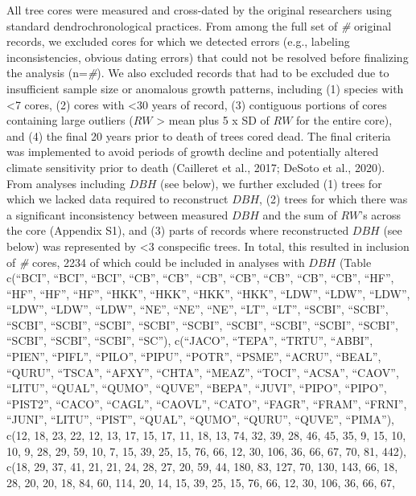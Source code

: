 \documentclass[
]{article}
\begin{document}
All tree cores were measured and cross-dated by the original researchers
using standard dendrochronological practices. From among the full set of
\emph{\#} original records, we excluded cores for which we detected
errors (e.g., labeling inconsistencies, obvious dating errors) that
could not be resolved before finalizing the analysis (n=\emph{\#}). We
also excluded records that had to be excluded due to insufficient sample
size or anomalous growth patterns, including (1) species with \textless7
cores, (2) cores with \textless30 years of record, (3) contiguous
portions of cores containing large outliers (\(RW\) \textgreater{} mean
plus 5 x SD of \(RW\) for the entire core), and (4) the final 20 years
prior to death of trees cored dead. The final criteria was implemented
to avoid periods of growth decline and potentially altered climate
sensitivity prior to death (Cailleret et al., 2017; DeSoto et al.,
2020). From analyses including \(DBH\) (see below), we further excluded
(1) trees for which we lacked data required to reconstruct \(DBH\), (2)
trees for which there was a significant inconsistency between measured
\(DBH\) and the sum of \(RW\)'s across the core (Appendix S1), and (3)
parts of records where reconstructed \(DBH\) (see below) was represented
by \textless3 conspecific trees. In total, this resulted in inclusion of
\emph{\#} cores, 2234 of which could be included in analyses with
\(DBH\) (Table c(``BCI'', ``BCI'', ``BCI'', ``CB'', ``CB'', ``CB'',
``CB'', ``CB'', ``CB'', ``CB'', ``HF'', ``HF'', ``HF'', ``HF'', ``HKK'',
``HKK'', ``HKK'', ``HKK'', ``LDW'', ``LDW'', ``LDW'', ``LDW'', ``LDW'',
``LDW'', ``NE'', ``NE'', ``NE'', ``LT'', ``LT'', ``SCBI'', ``SCBI'',
``SCBI'', ``SCBI'', ``SCBI'', ``SCBI'', ``SCBI'', ``SCBI'', ``SCBI'',
``SCBI'', ``SCBI'', ``SCBI'', ``SCBI'', ``SCBI'', ``SC''), c(``JACO'',
``TEPA'', ``TRTU'', ``ABBI'', ``PIEN'', ``PIFL'', ``PILO'', ``PIPU'',
``POTR'', ``PSME'', ``ACRU'', ``BEAL'', ``QURU'', ``TSCA'', ``AFXY'',
``CHTA'', ``MEAZ'', ``TOCI'', ``ACSA'', ``CAOV'', ``LITU'', ``QUAL'',
``QUMO'', ``QUVE'', ``BEPA'', ``JUVI'', ``PIPO'', ``PIPO'', ``PIST2'',
``CACO'', ``CAGL'', ``CAOVL'', ``CATO'', ``FAGR'', ``FRAM'', ``FRNI'',
``JUNI'', ``LITU'', ``PIST'', ``QUAL'', ``QUMO'', ``QURU'', ``QUVE'',
``PIMA''), c(12, 18, 23, 22, 12, 13, 17, 15, 17, 11, 18, 13, 74, 32, 39,
28, 46, 45, 35, 9, 15, 10, 10, 9, 28, 29, 59, 10, 7, 15, 39, 25, 15, 76,
66, 12, 30, 106, 36, 66, 67, 70, 81, 442), c(18, 29, 37, 41, 21, 21, 24,
28, 27, 20, 59, 44, 180, 83, 127, 70, 130, 143, 66, 18, 28, 20, 20, 18,
84, 60, 114, 20, 14, 15, 39, 25, 15, 76, 66, 12, 30, 106, 36, 66, 67,
\end{document}
